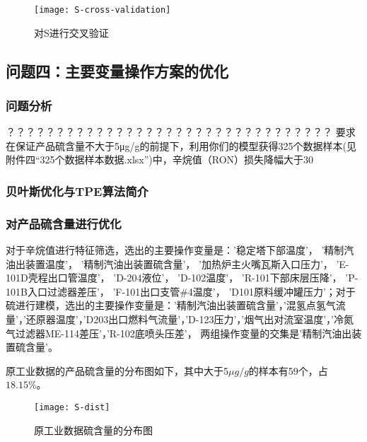 \documentclass[bwprint]{gmcmthesis}
\begin{document}
\begin{figure}[htb]
	\centering
	\texttt{[image: S-cross-validation]}
	\caption{对S进行交叉验证}
\end{figure}

\subsection{问题四：主要变量操作方案的优化}





\FloatBarrier
\subsubsection{问题分析}

？？？？？？？？？？？？？？？？？？？？？？？？？？？？？？？？？
要求在保证产品硫含量不大于5μg/g的前提下，利用你们的模型获得325个数据样本(见附件四“325个数据样本数据.xlsx”)中，辛烷值（RON）损失降幅大于30%

\FloatBarrier
\subsubsection{贝叶斯优化与TPE算法简介}

\FloatBarrier
\subsubsection{对产品硫含量进行优化}

对于辛烷值进行特征筛选，选出的主要操作变量是：'稳定塔下部温度'， '精制汽油出装置温度'， '精制汽油出装置硫含量'， '加热炉主火嘴瓦斯入口压力'， 'E-101D壳程出口管温度'， 'D-204液位'， 'D-102温度'， 'R-101下部床层压降'， 'P-101B入口过滤器差压'， 'F-101出口支管\#4温度'， 'D101原料缓冲罐压力'；对于硫进行建模，选出的主要操作变量是：'精制汽油出装置硫含量'，'混氢点氢气流量'，'还原器温度'，'D203出口燃料气流量'，'D-123压力'，'烟气出对流室温度'，'冷氮气过滤器ME-114差压'，'R-102底喷头压差'， 两组操作变量的交集是'精制汽油出装置硫含量'。

原工业数据的产品硫含量的分布图如下，其中大于5$\mu g/g$的样本有59个，占 $18.15\%$。

\begin{figure}[htb]
	\centering
	\texttt{[image: S-dist]}
	\caption{原工业数据硫含量的分布图}
\end{figure}
\end{document}
